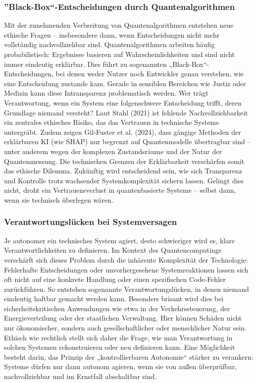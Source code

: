 \subsubsection{”Black-Box“-Entscheidungen durch Quantenalgorithmen}
Mit der zunehmenden Verbreitung von Quantenalgorithmen entstehen neue ethische Fragen – insbesondere dann, wenn Entscheidungen nicht mehr vollständig nachvollziehbar sind. Quantenalgorithmen arbeiten häufig probabilistisch: Ergebnisse basieren auf Wahrscheinlichkeiten und sind nicht immer eindeutig erklärbar. Dies führt zu sogenannten „Black-Box“-Entscheidungen, bei denen weder Nutzer noch Entwickler genau verstehen, wie eine Entscheidung zustande kam.
Gerade in sensiblen Bereichen wie Justiz oder Medizin kann diese Intransparenz problematisch werden. Wer trägt Verantwortung, wenn ein System eine folgenschwere Entscheidung trifft, deren Grundlage niemand versteht? Laut Stahl (2021) ist fehlende Nachvollziehbarkeit ein zentrales ethisches Risiko, das das Vertrauen in technische Systeme untergräbt.\cite{stahl_artificial_2021}
Zudem zeigen Gil-Fuster et al. (2024), dass gängige Methoden der erklärbaren KI (wie SHAP) nur begrenzt auf Quantenmodelle übertragbar sind – unter anderem wegen der komplexen Zustandsräume und der Natur der Quantenmessung. Die technischen Grenzen der Erklärbarkeit verschärfen somit das ethische Dilemma.\cite{gil-fuster_opportunities_2024}
Zukünftig wird entscheidend sein, wie sich Transparenz und Kontrolle trotz wachsender Systemkomplexität sichern lassen. Gelingt dies nicht, droht ein Vertrauensverlust in quantenbasierte Systeme – selbst dann, wenn sie technisch überlegen wären.

\subsubsection{Verantwortungslücken bei Systemversagen} 
 Je autonomer ein technisches System agiert, desto schwieriger wird es, klare Verantwortlichkeiten zu definieren. Im Kontext des Quantencomputings verschärft sich dieses Problem durch die inhärente Komplexität der Technologie: Fehlerhafte Entscheidungen oder unvorhergesehene Systemreaktionen lassen sich oft nicht auf eine konkrete Handlung oder einen spezifischen Code-Fehler zurückführen. So entstehen sogenannte Verantwortungslücken, in denen niemand eindeutig haftbar gemacht werden kann.
Besonders brisant wird dies bei sicherheitskritischen Anwendungen wie etwa in der Verkehrssteuerung, der Energieverteilung oder der staatlichen Verwaltung. Hier können Schäden nicht nur ökonomischer, sondern auch gesellschaftlicher oder menschlicher Natur sein. Ethisch wie rechtlich stellt sich daher die Frage, wie man Verantwortung in solchen Systemen rekonstruieren oder neu definieren kann. Eine Möglichkeit besteht darin, das Prinzip der „kontrollierbaren Autonomie“ stärker zu verankern: Systeme dürfen nur dann autonom agieren, wenn sie von außen überprüfbar, nachvollziehbar und im Ernstfall abschaltbar sind.\cite{floridi_ai4peopleethical_2018}
 
